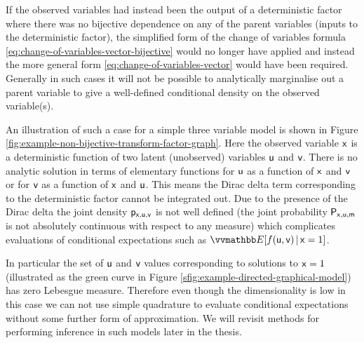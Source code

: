 If the observed variables had instead been the output of a deterministic factor where there was no bijective dependence on any of the parent variables (inputs to the deterministic factor), the simplified form of the change of variables formula \eqref{eq:change-of-variables-vector-bijective} would no longer have applied and instead the more general form \eqref{eq:change-of-variables-vector} would have been required. Generally in such cases it will not be possible to analytically marginalise out a parent variable to give a well-defined conditional density on the observed variable(s). 

An illustration of such a case for a simple three variable model is shown in Figure \ref{fig:example-non-bijective-transform-factor-graph}. Here the observed variable $\mathsf{x}$ is a deterministic function of two latent (unobserved) variables $\mathsf{u}$ and $\mathsf{v}$. There is no analytic solution in terms of elementary functions for $\mathsf{u}$ as a function of $\mathsf{x}$ and $\mathsf{v}$ or for $\mathsf{v}$ as a function of $\mathsf{x}$ and $\mathsf{u}$. This means the Dirac delta term corresponding to the deterministic factor cannot be integrated out. Due to the presence of the Dirac delta the joint density $\mathsf{p}_{\mathsf{x},\mathsf{u},\mathsf{v}}$ is not well defined (the joint probability $\mathsf{P}_{\mathsf{x},\mathsf{u},\mathsf{m}}$ is not absolutely continuous with respect to any measure) which complicates evaluations of conditional expectations such as $\expc{f(\rvar{u},\rvar{v}) \gvn \rvar{x} = 1}$. 

In particular the set of $\mathsf{u}$ and $\mathsf{v}$ values corresponding to solutions to $\mathsf{x} = 1$ (illustrated as the green curve in Figure \ref{sfig:example-directed-graphical-model}) has zero Lebesgue measure. Therefore even though the dimensionality is low in this case we can not use simple quadrature to evaluate conditional expectations without some further form of approximation. We will revisit methods for performing inference in such models later in the thesis.


